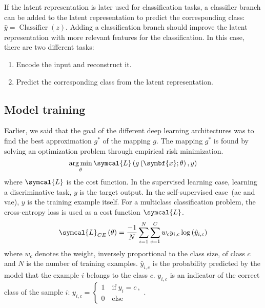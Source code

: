\documentclass[../main.tex]{subfiles}
\begin{document}
	 If the latent representation is later used for classification tasks, a classifier branch can be added to the latent representation to predict the corresponding class: \(\hat{y} = \operatorname{Classifier}\left(z\right)\).
	 Adding a classification branch should improve the latent representation with more relevant features for the classification.
	 In this case, there are two different tasks:
	 \begin{enumerate}[nosep]
		 \item Encode the input and reconstruct it.
		 \item Predict the corresponding class from the latent representation.
	 \end{enumerate}

 \subsection{}

 \subsection{Model training}
	 Earlier, we said that the goal of the different deep learning architectures was to find the best approximation \(g^{*}\) of the mapping \(g\).
	 The mapping \(g^{*}\) is found by solving an optimization problem through empirical risk minimization.
	 \begin{equation}
		 \argmin_{\theta} \symcal{L}\left(g\left(\symbf{x}; \theta\right), y\right) \label{eq:dl_opt}
	 \end{equation}
	 where \(\symcal{L}\) is the cost function.
	 In the supervised learning case, learning a discriminative task, \(y\) is the target output.
	 In the self-supervised case~(\gls{ae} and \gls{vae}), \(y\) is the training example itself.
	 For a multiclass classification problem, the cross-entropy loss is used as a cost function \(\symcal{L}\).
	 \begin{equation}
		 \symcal{L}_{CE}\left(\theta\right) = \frac{-1}{N}\sum_{i=1}^{N}\sum_{c=1}^{C} w_c y_{i,c}\log\left(\hat{y}_{i,c}\right)
	 \end{equation}
	 where \(w_c\) denotes the weight, inversely proportional to the class size, of class \(c\) and \(N\) is the number of training examples.
	 \(\hat{y}_{i,c}\) is the probability predicted by the model that the example \(i\) belongs to the class \(c\).
	 \(y_{i,c}\) is an indicator of the correct class of the sample \(i\):
	 \(
	 y_{i,c} = \begin{cases}
		 1 \quad \text{if}\; y_i = c \, , \\
		 0 \quad \text{else}
	 \end{cases}
	 \).
\end{document}
